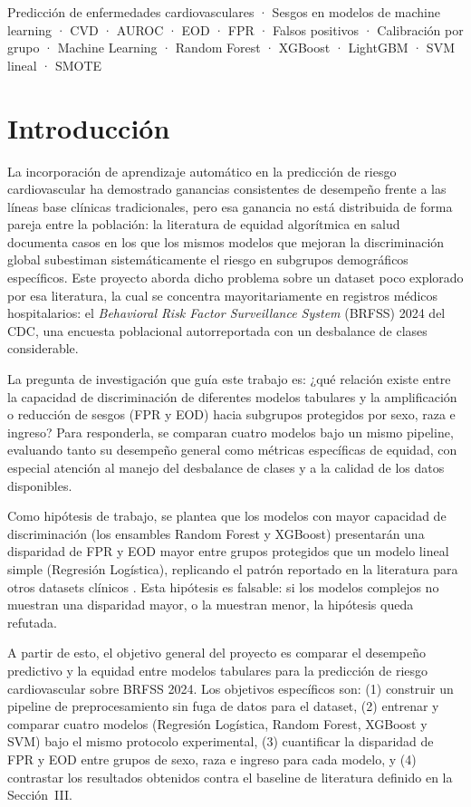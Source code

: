 \documentclass[conference]{IEEEtran}
\begin{document}
\begin{IEEEkeywords}

Predicción de enfermedades cardiovasculares · Sesgos en modelos de machine learning · CVD · AUROC · EOD · FPR · Falsos positivos · Calibración por grupo · Machine Learning · Random Forest · XGBoost · LightGBM · SVM lineal · SMOTE

\end{IEEEkeywords}

\section{Introducción}
La incorporación de aprendizaje automático en la predicción de riesgo cardiovascular ha demostrado ganancias consistentes de desempeño frente a las líneas base clínicas tradicionales, pero esa ganancia no está distribuida de forma pareja entre la población: la literatura de equidad algorítmica en salud documenta casos en los que los mismos modelos que mejoran la discriminación global subestiman sistemáticamente el riesgo en subgrupos demográficos específicos. Este proyecto aborda dicho problema sobre un dataset poco explorado por esa literatura, la cual se concentra mayoritariamente en registros médicos hospitalarios: el \textit{Behavioral Risk Factor Surveillance System} (BRFSS) 2024 del CDC, una encuesta poblacional autorreportada con un desbalance de clases considerable.

La pregunta de investigación que guía este trabajo es: ¿qué relación existe entre la capacidad de discriminación de diferentes modelos tabulares y la amplificación o reducción de sesgos (FPR y EOD) hacia subgrupos protegidos por sexo, raza e ingreso? Para responderla, se comparan cuatro modelos bajo un mismo pipeline, evaluando tanto su desempeño general como métricas específicas de equidad, con especial atención al manejo del desbalance de clases y a la calidad de los datos disponibles.

Como hipótesis de trabajo, se plantea que los modelos con mayor capacidad de discriminación (los ensambles Random Forest y XGBoost) presentarán una disparidad de FPR y EOD mayor entre grupos protegidos que un modelo lineal simple (Regresión Logística), replicando el patrón reportado en la literatura para otros datasets clínicos \cite{li2023evaluating}. Esta hipótesis es falsable: si los modelos complejos no muestran una disparidad mayor, o la muestran menor, la hipótesis queda refutada.

A partir de esto, el objetivo general del proyecto es comparar el desempeño predictivo y la equidad entre modelos tabulares para la predicción de riesgo cardiovascular sobre BRFSS 2024. Los objetivos específicos son: (1) construir un pipeline de preprocesamiento sin fuga de datos para el dataset, (2) entrenar y comparar cuatro modelos (Regresión Logística, Random Forest, XGBoost y SVM) bajo el mismo protocolo experimental, (3) cuantificar la disparidad de FPR y EOD entre grupos de sexo, raza e ingreso para cada modelo, y (4) contrastar los resultados obtenidos contra el baseline de literatura definido en la Sección~III.
\end{document}
